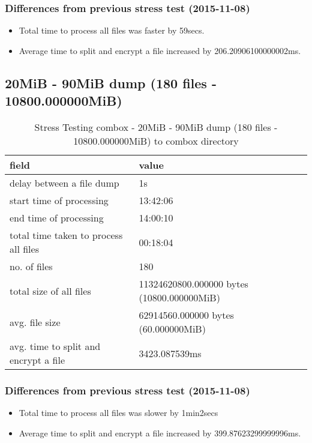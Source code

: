 \subsubsection{Differences from previous stress test (2015-11-08)}

\begin{itemize}
\item Total time to process all files was faster by 59secs.
\item Average time to split and encrypt a file increased by
  206.20906100000002ms.
\end{itemize}

\subsection{20MiB - 90MiB dump (180 files - 10800.000000MiB)}\label{4-st-10800}

\begin{center}
\begin{table}[h]
\begin{tabular}{ll}
field & value\\
\hline
delay between a file dump & 1s\\
start time of processing & 13:42:06\\
end time of processing & 14:00:10\\
total time taken to process all files & 00:18:04\\
no. of files & 180\\
total size of all files & 11324620800.000000 bytes (10800.000000MiB)\\
avg. file size & 62914560.000000 bytes (60.000000MiB)\\
avg. time to split and encrypt a file & 3423.087539ms\\
\end{tabular}
\caption{Stress Testing combox - 20MiB - 90MiB dump (180 files - 10800.000000MiB) to combox directory}
\end{table}
\end{center}

\subsubsection{Differences from previous stress test (2015-11-08)}

\begin{itemize}
\item Total time to process all files was slower by 1min2secs
\item Average time to split and encrypt a file increased by
  399.87623299999996ms.
\end{itemize}

